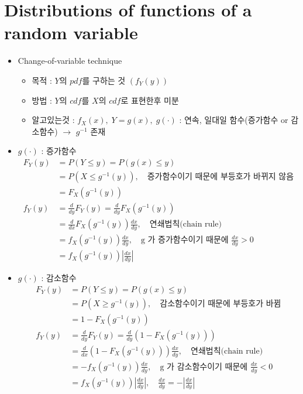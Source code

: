 \documentclass{oblivoir}
\begin{document}
\section{Distributions of functions of a random variable}
\begin{itemize}
\item Change-of-variable technique
\begin{itemize}
\item 목적 : $Y$의 $pdf$를 구하는 것 $(f_Y(y))$
\item 방법 : $Y$의 $cdf$를 $X$의 $cdf$로 표현한후 미분
\item 알고있는것 : $f_X(x), \; Y = g(x), \; g(\cdot)$ : 연속, 일대일 함수(증가함수 or 감소함수) $\rightarrow$ $g^{-1}$ 존재
\end{itemize}

\item $g(\cdot)$ : 증가함수
\begin{align*}
F_Y(y) &= P(Y \leq y) = P(g(x) \leq y) \\
&= P(X \leq g^{-1} (y)), \quad \mbox{증가함수이기 때문에 부등호가 바뀌지 않음}\\
&= F_X(g^{-1}(y)) \\
f_Y(y) &= \frac{d}{dy} F_Y(y) = \frac{d}{dy} F_X(g^{-1}(y)) \\
&= \frac{d}{dx} F_X(g^{-1}(y)) \frac{dx}{dy}, \quad \mbox{연쇄법칙(chain rule)}\\
&= f_X(g^{-1}(y)) \frac{dx}{dy}, \quad \mbox{g 가 증가함수이기 때문에 } \frac{dx}{dy} > 0 \\
&= f_X(g^{-1}(y)) \left|\frac{dx}{dy}\right|
\end{align*}

\item $g(\cdot)$ : 감소함수
\begin{align*}
F_Y(y) &= P(Y \leq y) = P(g(x) \leq y) \\
&= P(X \geq g^{-1} (y)), \quad \mbox{감소함수이기 때문에 부등호가 바뀜}\\
&= 1 - F_X(g^{-1}(y)) \\
f_Y(y) &= \frac{d}{dy} F_Y(y) = \frac{d}{dy} (1 - F_X(g^{-1}(y))) \\
&= \frac{d}{dx} (1 - F_X(g^{-1}(y))) \frac{dx}{dy}, \quad \mbox{연쇄법칙(chain rule)}\\
&=  - f_X(g^{-1}(y)) \frac{dx}{dy}, \quad \mbox{g 가 감소함수이기 때문에 } \frac{dx}{dy} < 0 \\
&= f_X(g^{-1}(y)) \left|\frac{dx}{dy}\right|, \quad \frac{dx}{dy} = - \left|\frac{dx}{dy} \right|
\end{align*}


\end{itemize}
\end{document}
